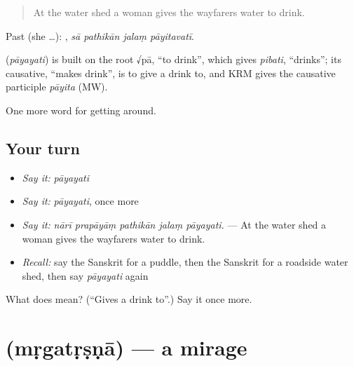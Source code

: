 \begin{quote}
At the water shed a woman gives the wayfarers water to drink.
\end{quote}

Past (she …):    , \emph{sā pathikān jalaṃ pāyitavatī}.

\begin{cousinweb}
\textbf{} (\emph{pāyayati}) is built on the root √pā, \textquotedblleft{}to drink\textquotedblright{}, which gives \emph{pibati}, \textquotedblleft{}drinks\textquotedblright{}; its causative, \textquotedblleft{}makes drink\textquotedblright{}, is to give a drink to, and KRM gives the causative participle \emph{pāyita} (MW).
\end{cousinweb}

\begin{grammarlens}[title={What you've built}]
One more word for getting around.
\end{grammarlens}

\subsection*{Your turn}
\begin{itemize}
\raggedright
  \item \emph{Say it:} \emph{pāyayati}
  \item \emph{Say it:} \emph{pāyayati}, once more
  \item \emph{Say it:} \emph{nārī prapāyāṃ pathikān jalaṃ pāyayati.} — At the water shed a woman gives the wayfarers water to drink.
  \item \emph{Recall:} say the Sanskrit for a puddle, then the Sanskrit for a roadside water shed, then say \emph{pāyayati} again
\end{itemize}

\begin{tcolorbox}[breakable,colback=teal!4,colframe=teal!35!black,title={Before you move on}]
What does  mean? (\textquotedblleft{}Gives a drink to\textquotedblright{}.) Say it once more.
\end{tcolorbox}
\section[\texorpdfstring{\sk{मृगतृष्णा} (mṛgatṛṣṇā)}{मृगतृष्णा (mṛgatṛṣṇā)}]{ (mṛgatṛṣṇā) — a mirage}

\label{lesson:SA-C420-mrgatrsna}



